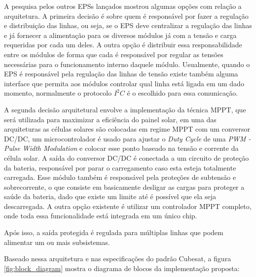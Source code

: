 A pesquisa pelos outros EPSs lançados mostrou algumas opções com relação a arquitetura. A primeira decisão é sobre quem é responsável por fazer a regulação e distribuição das linhas, ou seja, se o EPS deve centralizar a regulação das linhas e já fornecer a alimentação para os diversos módulos já com a tensão e carga requeridas por cada um deles. A outra opção é distribuir essa responsabilidade entre os módulos de forma que cada é responsável por regular as tensões necessárias para o funcionamento interno daquele módulo. Usualmente, quando o EPS é responsável pela regulação das linhas de tensão existe também alguma interface que permita aos módulos controlar qual linha está ligada em um dado momento, normalmente o protocolo $I^{2}C$ é o escolhido para essa comunicação.

A segunda decisão arquitetural envolve a implementação da técnica MPPT, que será utilizada para maximizar a eficiência do painel solar, em uma das arquiteturas as células solares são colocadas em regime MPPT com um conversor DC/DC, um microcontrolador é usado para ajustar o \textit{Duty Cycle} de uma \textit{PWM - Pulse Width Modulation} e colocar esse ponto baseado na tensão e corrente da célula solar. A saída do conversor DC/DC é conectada a um circuito de proteção da bateria, responsável por parar o carregamento caso esta esteja totalmente carregada. Esse módulo também é responsável pela proteções de subtensão e sobrecorrente, o que consiste em basicamente desligar as cargas para proteger a saúde da bateria, dado que existe um limite até é possível que ela seja descarregada. A outra opção existente é utilizar um controlador MPPT completo, onde toda essa funcionalidade está integrada em um único chip.

Após isso, a saída protegida é regulada para múltiplas linhas que podem alimentar um ou mais subsistemas. 

Baseado nessa arquitetura e nas especificações do padrão Cubesat, a figura \ref{fig:block_diagram} mostra o diagrama de blocos da implementação proposta:

\noindent
\begin{minipage}{\linewidth}
\label{fig:block_diagram}
\end{minipage}

